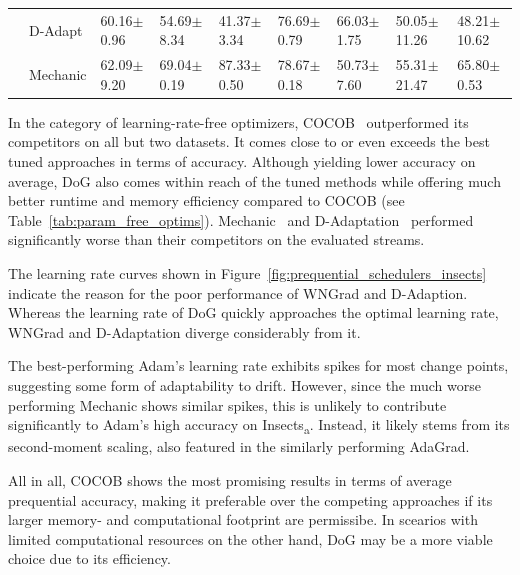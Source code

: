 \documentclass{article} %
\begin{document}
\begin{table}[t]
\begin{tabular}{lllllllll}
                                                         & D-Adapt   & 60.16$\pm$0.96             & 54.69$\pm$8.34             & 41.37$\pm$3.34             & 76.69$\pm$0.79             & 66.03$\pm$1.75           & 50.05$\pm$11.26          & 48.21$\pm$10.62          \\
                                                         & Mechanic  & 62.09$\pm$9.20             & 69.04$\pm$0.19             & 87.33$\pm$0.50             & 78.67$\pm$0.18             & 50.73$\pm$7.60           & 55.31$\pm$21.47          & 65.80$\pm$0.53           \\
      \bottomrule
   \end{tabular}
   \label{tab:results_adaptive_optims}
\end{table}
In the category of learning-rate-free optimizers, COCOB~\citep{orabonaTrainingDeepNetworks2017} outperformed its competitors on all but two datasets.
It comes close to or even exceeds the best tuned approaches in terms of accuracy.
Although yielding lower accuracy on average, DoG also comes within reach of the tuned methods while offering much better runtime and memory efficiency compared to COCOB (see Table~\ref{tab:param_free_optims}).
Mechanic~\citep{cutkoskyMechanicLearningRate2023} and D-Adaptation~\citep{defazioLearningRateFreeLearningDAdaptation2023a} performed significantly worse than their competitors on the evaluated streams.

The learning rate curves shown in Figure~\ref{fig:prequential_schedulers_insects} indicate the reason for the poor performance of WNGrad and D-Adaption.
Whereas the learning rate of DoG quickly approaches the optimal learning rate, WNGrad and D-Adaptation diverge considerably from it.

The best-performing Adam's learning rate exhibits spikes for most change points, suggesting some form of adaptability to drift.
However, since the much worse performing Mechanic shows similar spikes, this is unlikely to contribute significantly to Adam's high accuracy on Insects\textsubscript{a}.
Instead, it likely stems from its second-moment scaling, also featured in the similarly performing AdaGrad.

All in all, COCOB shows the most promising results in terms of average prequential accuracy, making it preferable over the competing approaches if its larger memory- and computational footprint are permissibe.
In scearios with limited computational resources on the other hand, DoG may be a more viable choice due to its efficiency.
\end{document}
